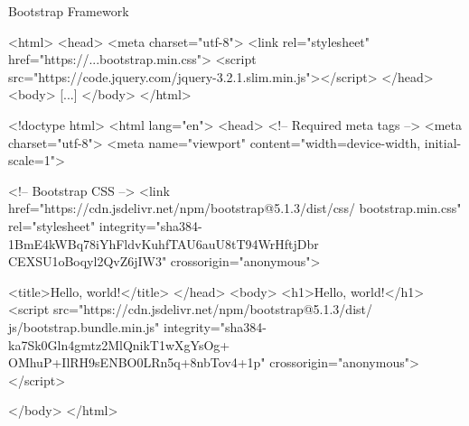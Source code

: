 \begin{frame}{Bootstrap Framework}
\begin{htmlcode}
<html>
    <head>
    <meta charset="utf-8">
    <link rel="stylesheet" href="https://...bootstrap.min.css">
    <script src="https://code.jquery.com/jquery-3.2.1.slim.min.js"></script>
    </head>
    <body> [...] </body>
</html>
\end{htmlcode}


\framebreak 

\begin{htmlcode}
<!doctype html>
<html lang="en">
  <head>
    <!-- Required meta tags -->
    <meta charset="utf-8">
    <meta name="viewport" content="width=device-width, initial-scale=1">

    <!-- Bootstrap CSS -->
    <link href="https://cdn.jsdelivr.net/npm/bootstrap@5.1.3/dist/css/
    bootstrap.min.css" rel="stylesheet"
    integrity="sha384-1BmE4kWBq78iYhFldvKuhfTAU6auU8tT94WrHftjDbr
    CEXSU1oBoqyl2QvZ6jIW3" crossorigin="anonymous">

    <title>Hello, world!</title>
  </head>
  <body>
    <h1>Hello, world!</h1>
    <script src="https://cdn.jsdelivr.net/npm/bootstrap@5.1.3/dist/
    js/bootstrap.bundle.min.js" 
    integrity="sha384-ka7Sk0Gln4gmtz2MlQnikT1wXgYsOg+
    OMhuP+IlRH9sENBO0LRn5q+8nbTov4+1p" 
    crossorigin="anonymous"></script>

  </body>
</html>
\end{htmlcode}

\end{frame}


